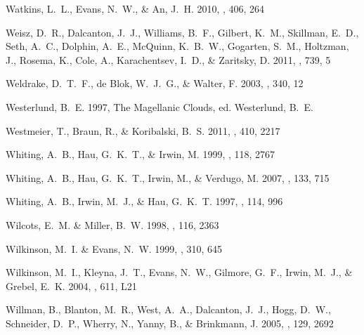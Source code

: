 \documentclass[manuscript]{aastex}
\begin{document}
\begin{thebibliography}{381}
{Watkins}, L.~L., {Evans}, N.~W., \& {An}, J.~H. 2010, \mnras, 406, 264

{Weisz}, D.~R., {Dalcanton}, J.~J., {Williams}, B.~F., {Gilbert}, K.~M.,
  {Skillman}, E.~D., {Seth}, A.~C., {Dolphin}, A.~E., {McQuinn}, K.~B.~W.,
  {Gogarten}, S.~M., {Holtzman}, J., {Rosema}, K., {Cole}, A., {Karachentsev},
  I.~D., \& {Zaritsky}, D. 2011, \apj, 739, 5

{Weldrake}, D.~T.~F., {de Blok}, W.~J.~G., \& {Walter}, F. 2003, \mnras, 340,
  12

{Westerlund}, B.~E. 1997, {The Magellanic Clouds}, ed. {Westerlund, B.~E.}

{Westmeier}, T., {Braun}, R., \& {Koribalski}, B.~S. 2011, \mnras, 410, 2217

{Whiting}, A.~B., {Hau}, G.~K.~T., \& {Irwin}, M. 1999, \aj, 118, 2767

{Whiting}, A.~B., {Hau}, G.~K.~T., {Irwin}, M., \& {Verdugo}, M. 2007, \aj,
  133, 715

{Whiting}, A.~B., {Irwin}, M.~J., \& {Hau}, G.~K.~T. 1997, \aj, 114, 996

{Wilcots}, E.~M. \& {Miller}, B.~W. 1998, \aj, 116, 2363

{Wilkinson}, M.~I. \& {Evans}, N.~W. 1999, \mnras, 310, 645

{Wilkinson}, M.~I., {Kleyna}, J.~T., {Evans}, N.~W., {Gilmore}, G.~F., {Irwin},
  M.~J., \& {Grebel}, E.~K. 2004, \apjl, 611, L21

{Willman}, B., {Blanton}, M.~R., {West}, A.~A., {Dalcanton}, J.~J., {Hogg},
  D.~W., {Schneider}, D.~P., {Wherry}, N., {Yanny}, B., \& {Brinkmann}, J.
  2005{}, \aj, 129, 2692


\end{thebibliography}
\end{document}
